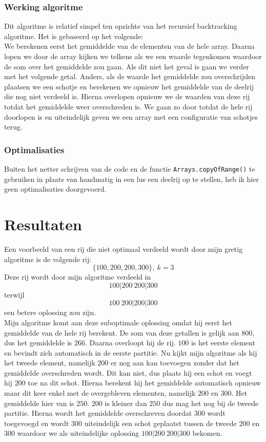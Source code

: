 \documentclass[12pt,a4paper]{report}
\begin{document}
\subsubsection*{Werking algoritme}
Dit algoritme is relatief simpel ten opzichte van het recursief backtracking algoritme. Het is gebaseerd op het volgende:\\
We berekenen eerst het gemiddelde van de elementen van de hele array. Daarna lopen we door de array kijken we telkens als we een waarde tegenkomen waardoor de som over het gemiddelde zou gaan. Als dit niet het geval is gaan we verder met het volgende getal. Anders, als de waarde het gemiddelde zou overschrijden plaatsen we een schotje en berekenen we opnieuw het gemiddelde van de deelrij die nog niet verdeeld is. Hierna overlopen opnieuw we de waarden van deze rij totdat het gemiddelde weer overschreden is. We gaan zo door totdat de hele rij doorlopen is en uiteindelijk geven we een array met een configuratie van schotjes terug.

\subsubsection*{Optimalisaties}
Buiten het netter schrijven van de code en de functie \texttt{Arrays.copyOfRange()} te gebruiken in plaats van handmatig in een lus een deelrij op te stellen, heb ik hier geen optimalisaties doorgevoerd.

\section*{Resultaten}
Een voorbeeld van een rij die niet optimaal verdeeld wordt door mijn gretig algoritme is de volgende rij:
\begin{equation*}
\{100, 200, 200, 300\},~k=3
\end{equation*}
Deze rij wordt door mijn algoritme verdeeld in 
\begin{equation*}
100|200~200|300
\end{equation*}
terwijl 
\begin{equation*}
100~200|200|300
\end{equation*}
een betere oplossing zou zijn.\\

Mijn algoritme komt aan deze suboptimale oplossing omdat hij eerst het gemiddelde van de hele rij berekent. De som van deze getallen is gelijk aan $800$, dus het gemiddelde is $266$. Daarna overloopt hij de rij. $100$ is het eerste element en bevindt zich automatisch in de eerste partitie. Nu kijkt mijn algoritme als hij het tweede element, namelijk $200$ er nog aan kan toevoegen zonder dat het gemiddelde overschreden wordt. Dit kan niet, dus plaats hij een schot en voegt hij $200$ toe na dit schot. Hierna berekent hij het gemiddelde automatisch opnieuw maar dit keer enkel met de overgebleven elementen, namelijk $200$ en $300$. Het gemiddelde hier van is $250$. $200$ is kleiner dan $250$ dus mag het nog bij de tweede partitie. Hierna wordt het gemiddelde overschreven doordat $300$ wordt toegevoegd en wordt $300$ uiteindelijk een schot geplaatst tussen de tweede $200$ en $300$ waardoor we als uiteindelijke oplossing $100|200~200|300$ bekomen.
\end{document}
